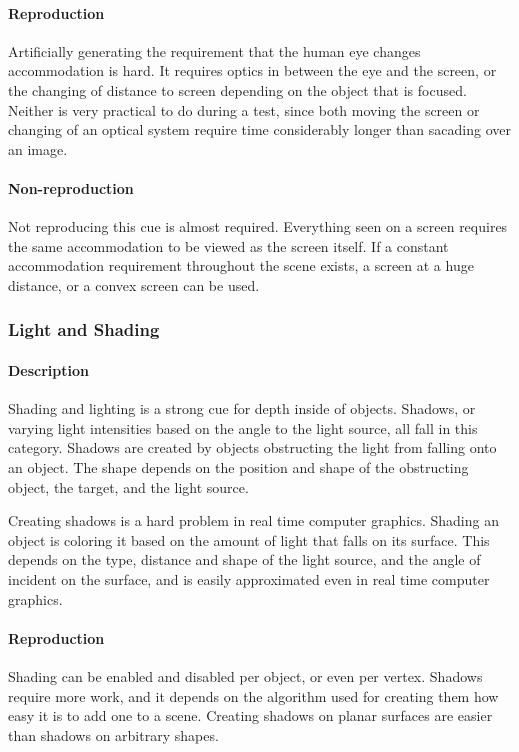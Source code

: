 \paragraph{Reproduction}
Artificially generating the requirement that the human eye changes accommodation is hard.
It requires optics in between the eye and the screen, or the changing of distance to screen depending on the object that is focused.
Neither is very practical to do during a test, since both moving the screen or changing of an optical system require time considerably longer than sacading over an image.

\paragraph{Non-reproduction}
Not reproducing this cue is almost required. Everything seen on a screen requires the same accommodation to be viewed as the screen itself. If a constant accommodation requirement throughout the scene exists, a screen at a huge distance, or a convex screen can be used.


\subsubsection{Light and Shading}
\paragraph{Description}
Shading and lighting is a strong cue for depth inside of objects.
Shadows, or varying light intensities based on the angle to the light source, all fall in this category.
Shadows are created by objects obstructing the light from falling onto an object.
The shape depends on the position and shape of the obstructing object, the target, and the light source.

Creating shadows is a hard problem in real time computer graphics.
Shading an object is coloring it based on the amount of light that falls on its surface.
This depends on the type, distance and shape of the light source, and the angle of incident on the surface, and is easily approximated even in real time computer graphics.

\paragraph{Reproduction}
Shading can be enabled and disabled per object, or even per vertex.
Shadows require more work, and it depends on the algorithm used for creating them how easy it is to add one to a scene.
Creating shadows on planar surfaces are easier than shadows on arbitrary shapes.

